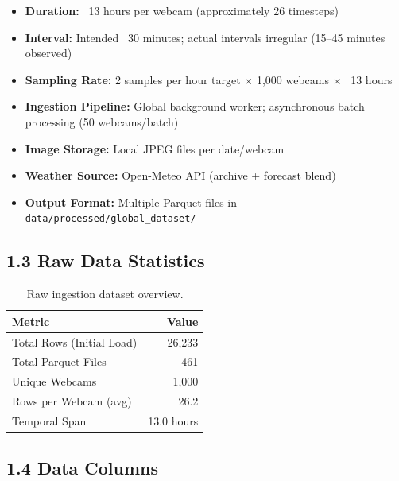 \documentclass[11pt,a4paper]{article}
\begin{document}
\begin{itemize}
    \item \textbf{Duration:} ~13 hours per webcam (approximately 26 timesteps)
    \item \textbf{Interval:} Intended ~30 minutes; actual intervals irregular (15--45 minutes observed)
    \item \textbf{Sampling Rate:} 2 samples per hour target $\times$ 1,000 webcams $\times$ ~13 hours
    \item \textbf{Ingestion Pipeline:} Global background worker; asynchronous batch processing (50 webcams/batch)
    \item \textbf{Image Storage:} Local JPEG files per date/webcam
    \item \textbf{Weather Source:} Open-Meteo API (archive + forecast blend)
    \item \textbf{Output Format:} Multiple Parquet files in \texttt{data/processed/global\_dataset/}
\end{itemize}

\subsection{1.3 Raw Data Statistics}

\begin{table}[h]
\centering
\begin{tabular}{lr}
\toprule
\textbf{Metric} & \textbf{Value} \\
\midrule
Total Rows (Initial Load) & 26,233 \\
Total Parquet Files & ~461 \\
Unique Webcams & 1,000 \\
Rows per Webcam (avg) & 26.2 \\
Temporal Span & 13.0 hours \\
\bottomrule
\end{tabular}
\caption{Raw ingestion dataset overview.}
\end{table}

\subsection{1.4 Data Columns}
\end{document}
